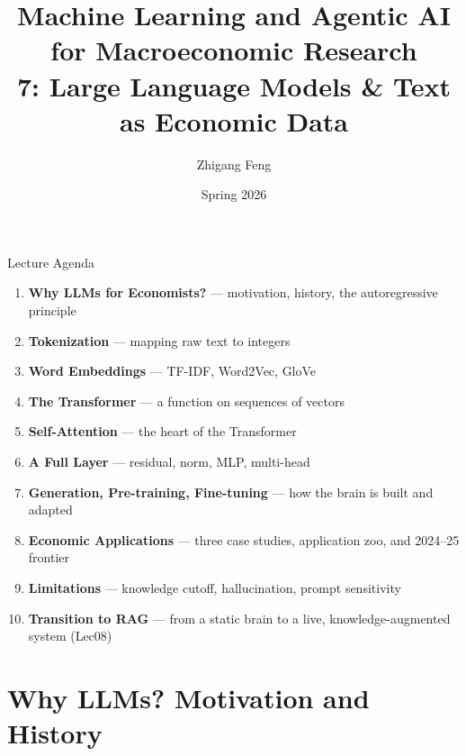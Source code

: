 \documentclass[10pt,english,aspectratio=169]{beamer}
\title[ML \& Agentic AI for Macro Research]{Machine Learning and Agentic AI for Macroeconomic Research\\
7: Large Language Models \& Text as Economic Data\\[0.5em]}
\author{Zhigang Feng}
\date{Spring 2026}
\newcommand\makebeamertitle{\frame{\maketitle}}%
\begin{document}
\makebeamertitle


\begin{frame}{Lecture Agenda}
\begin{enumerate}
  \item \textbf{Why LLMs for Economists?} --- motivation, history, the autoregressive principle
  \medskip
  \item \textbf{Tokenization} --- mapping raw text to integers
  \medskip
  \item \textbf{Word Embeddings} --- TF-IDF, Word2Vec, GloVe
  \medskip
  \item \textbf{The Transformer} --- a function on sequences of vectors
  \medskip
  \item \textbf{Self-Attention} --- the heart of the Transformer
  \medskip
  \item \textbf{A Full Layer} --- residual, norm, MLP, multi-head
  \medskip
  \item \textbf{Generation, Pre-training, Fine-tuning} --- how the brain is built and adapted
  \medskip
  \item \textbf{Economic Applications} --- three case studies, application zoo, and 2024--25 frontier
  \medskip
  \item \textbf{Limitations} --- knowledge cutoff, hallucination, prompt sensitivity
  \medskip
  \item \textbf{Transition to RAG} --- from a static brain to a live, knowledge-augmented system (Lec08)
\end{enumerate}
\end{frame}


\section{Why LLMs? Motivation and History}
\end{document}
